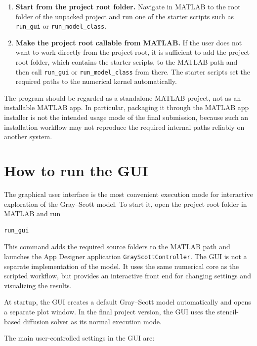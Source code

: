 \begin{enumerate}
    \item \textbf{Start from the project root folder.} Navigate in MATLAB to the root folder of the unpacked project and run one of the starter scripts such as \texttt{run\_gui} or \texttt{run\_model\_class}.
    \item \textbf{Make the project root callable from MATLAB.} If the user does not want to work directly from the project root, it is sufficient to add the project root folder, which contains the starter scripts, to the MATLAB path and then call \texttt{run\_gui} or \texttt{run\_model\_class} from there. The starter scripts set the required paths to the numerical kernel automatically.
\end{enumerate}

The program should be regarded as a standalone MATLAB project, not as an installable MATLAB app. In particular, packaging it through the MATLAB app installer is not the intended usage mode of the final submission, because such an installation workflow may not reproduce the required internal paths reliably on another system.

\section{How to run the GUI}
\label{sec:manual_gui}

The graphical user interface is the most convenient execution mode for interactive exploration of the Gray--Scott model. To start it, open the project root folder in MATLAB and run

\begin{verbatim}
run_gui
\end{verbatim}

This command adds the required source folders to the MATLAB path and launches the App Designer application \texttt{GrayScottController}. The GUI is not a separate implementation of the model. It uses the same numerical core as the scripted workflow, but provides an interactive front end for changing settings and visualizing the results.

At startup, the GUI creates a default Gray--Scott model automatically and opens a separate plot window. In the final project version, the GUI uses the stencil-based diffusion solver as its normal execution mode.

The main user-controlled settings in the GUI are:


